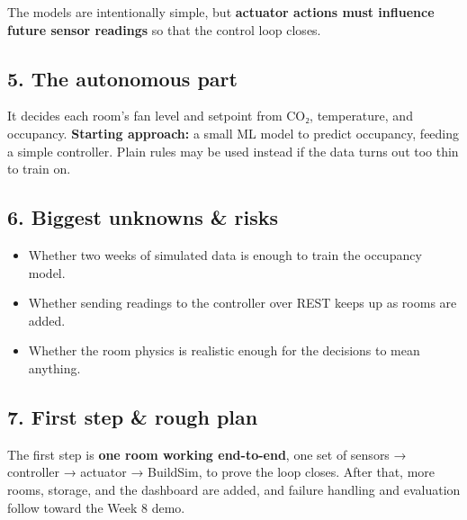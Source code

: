 \documentclass[
  11pt,
]{article}
\providecommand{\tightlist}{%
  \setlength{\itemsep}{0pt}\setlength{\parskip}{0pt}}
\begin{document}
The models are intentionally simple, but \textbf{actuator actions must
influence future sensor readings} so that the control loop closes.

\hypertarget{the-autonomous-part}{%
\subsection{5. The autonomous part}\label{the-autonomous-part}}

It decides each room's fan level and setpoint from CO₂, temperature, and
occupancy. \textbf{Starting approach:} a small ML model to predict
occupancy, feeding a simple controller. Plain rules may be used instead
if the data turns out too thin to train on.

\hypertarget{biggest-unknowns-risks}{%
\subsection{6. Biggest unknowns \& risks}\label{biggest-unknowns-risks}}

\begin{itemize}
\tightlist
\item
  Whether two weeks of simulated data is enough to train the occupancy
  model.
\item
  Whether sending readings to the controller over REST keeps up as
  rooms are added.
\item
  Whether the room physics is realistic enough for the decisions to mean
  anything.
\end{itemize}

\hypertarget{first-step-rough-plan}{%
\subsection{7. First step \& rough plan}\label{first-step-rough-plan}}

The first step is \textbf{one room working end-to-end}, one set of
sensors → controller → actuator → BuildSim, to prove the loop closes.
After that, more rooms, storage, and the dashboard are added, and failure
handling and evaluation follow toward the Week 8 demo.
\end{document}

